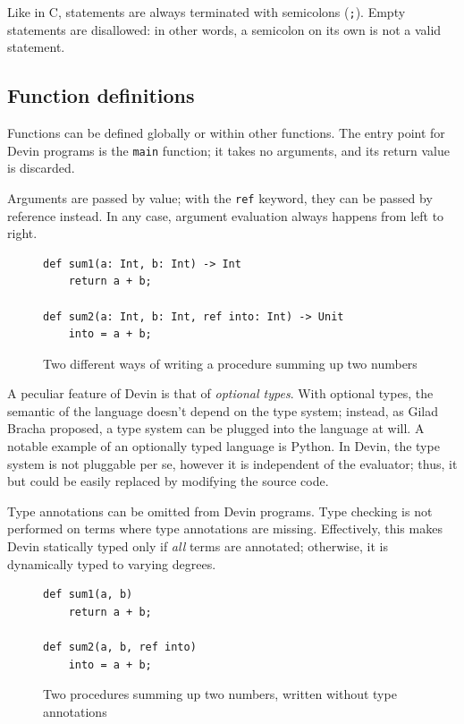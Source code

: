 \documentclass[11pt, american, draft]{PhdThesis}
\begin{document}
  Like in C, statements are always terminated with semicolons (\verb$;$). Empty statements are
  disallowed: in other words, a semicolon on its own is not a valid statement.

  \subsection{Function definitions}

  Functions can be defined globally or within other functions. The entry point for Devin programs is
  the \verb$main$ function; it takes no arguments, and its return value is discarded.

  Arguments are passed by value; with the \texttt{ref} keyword, they can be passed by reference
  instead. In any case, argument evaluation always happens from left to right.

  \begin{figure}[H]
    \center

    \begin{verbatim}
def sum1(a: Int, b: Int) -> Int
    return a + b;

def sum2(a: Int, b: Int, ref into: Int) -> Unit
    into = a + b;
    \end{verbatim}

    \caption{Two different ways of writing a procedure summing up two numbers}
  \end{figure}

  A peculiar feature of Devin is that of \emph{optional types}. With optional types, the semantic of
  the language doesn't depend on the type system; instead, as Gilad Bracha proposed\cite{bracha}, a
  type system can be plugged into the language at will. A notable example of an optionally typed
  language is Python. In Devin, the type system is not pluggable per se, however it is independent
  of the evaluator; thus, it but could be easily replaced by modifying the source code.

  Type annotations can be omitted from Devin programs. Type checking is not performed on terms where
  type annotations are missing. Effectively, this makes Devin statically typed only if \emph{all}
  terms are annotated; otherwise, it is dynamically typed to varying degrees.

  \begin{figure}[H]
    \center

    \begin{verbatim}
def sum1(a, b)
    return a + b;

def sum2(a, b, ref into)
    into = a + b;
    \end{verbatim}

    \caption{Two procedures summing up two numbers, written without type annotations}
  \end{figure}
\end{document}
